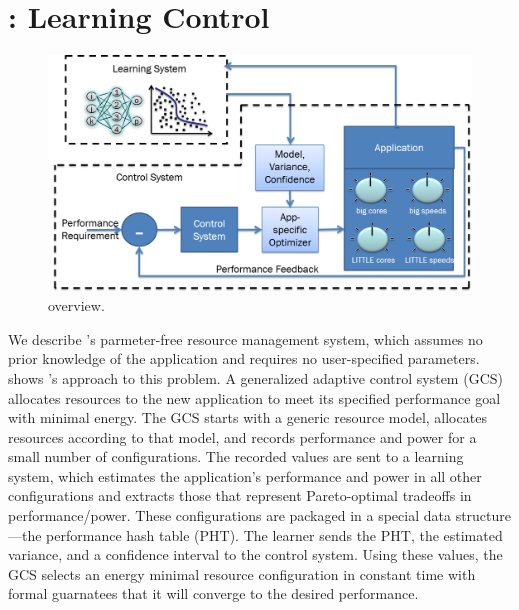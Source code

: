 \section{\SYSTEM{}: Learning Control}
\label{sec:framework}



\begin{figure}
  \includegraphics[width=\columnwidth]{figures/Overview.png}
  \caption{\SYSTEM{} overview.}
  \label{fig:overview}
\end{figure}


We describe \SYSTEM{}'s parmeter-free resource management system,
which assumes no prior knowledge of the application and requires no
user-specified parameters.   shows \SYSTEM{}'s
approach to this problem.  A generalized adaptive control system (GCS)
allocates resources to the new application to meet its specified
performance goal with minimal energy.  The GCS starts with a generic
resource model, allocates resources according to that model, and
records performance and power for a small number of configurations.
The recorded values are sent to a learning system, which estimates the
application's performance and power in all other configurations and
extracts those that represent Pareto-optimal tradeoffs in
performance/power.  These configurations are packaged in a special
data structure---the performance hash table (PHT).  The learner sends
the PHT, the estimated variance, and a confidence interval to the
control system.  Using these values, the GCS selects an energy minimal
resource configuration in constant time with formal guarnatees that it
will converge to the desired performance.

